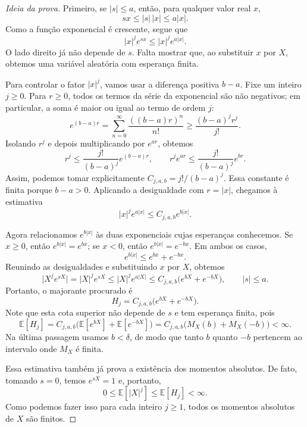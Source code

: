 \documentclass[12pt,portuguese]{article}
\theoremstyle{definition}
\theoremstyle{plainexercise}
\theoremstyle{starredexercise}
\theoremstyle{definition}
\begin{document}
\begin{proof}[Ideia da prova]
Primeiro, se $|s|\leqslant a$, então, para qualquer valor real $x$,
\[
sx\leqslant |s|\,|x|\leqslant a|x|.
\]
Como a função exponencial é crescente, segue que
\[
|x|^j e^{sx}\leqslant |x|^j e^{a|x|}.
\]
O lado direito já não depende de $s$. Falta mostrar que, ao substituir
$x$ por $X$, obtemos uma variável aleatória com esperança finita.

Para controlar o fator $|x|^j$, vamos usar a diferença positiva $b-a$.
Fixe um inteiro $j\geqslant0$. Para $r\geqslant0$, todos os termos da
série da exponencial são não negativos; em particular, a soma é maior
ou igual ao termo de ordem $j$:
\[
e^{(b-a)r}
=\sum_{n=0}^{\infty}\frac{((b-a)r)^n}{n!}
\geqslant\frac{(b-a)^j r^j}{j!}.
\]
Isolando $r^j$ e depois multiplicando por $e^{ar}$, obtemos
\[
r^j\leqslant\frac{j!}{(b-a)^j}e^{(b-a)r},
\qquad
r^j e^{ar}\leqslant\frac{j!}{(b-a)^j}e^{br}.
\]
Assim, podemos tomar explicitamente
$C_{j,a,b}=j!/(b-a)^j$. Essa constante é finita porque $b-a>0$.
Aplicando a desigualdade com $r=|x|$, chegamos à estimativa
\[
|x|^j e^{a|x|}\leqslant C_{j,a,b} e^{b|x|}.
\]

Agora relacionamos $e^{b|x|}$ às duas exponenciais cujas esperanças
conhecemos. Se $x\geqslant0$, então $e^{b|x|}=e^{bx}$; se $x<0$, então
$e^{b|x|}=e^{-bx}$. Em ambos os casos,
\[
e^{b|x|}\leqslant e^{bx}+e^{-bx}.
\]
Reunindo as desigualdades e substituindo $x$ por $X$, obtemos
\[
\bigl|X^j e^{sX}\bigr|
=|X|^j e^{sX}
\leqslant |X|^j e^{a|X|}
\leqslant C_{j,a,b}\bigl(e^{bX}+e^{-bX}\bigr),
\qquad |s|\leqslant a.
\]
Portanto, o majorante procurado é
\begin{equation}\label{eq:fgm-def-majorante}
H_j=C_{j,a,b}\bigl(e^{bX}+e^{-bX}\bigr).
\end{equation}
Note que esta cota superior não depende de $s$ e tem esperança finita, pois
\[
\mathbb{E}[H_j]
=C_{j,a,b}\bigl(\mathbb{E}[e^{bX}]+\mathbb{E}[e^{-bX}]\bigr)
=C_{j,a,b}\bigl(M_X(b)+M_X(-b)\bigr)<\infty.
\]
Na última passagem usamos $b<\delta$, de modo que tanto $b$ quanto $-b$
pertencem ao intervalo onde $M_X$ é finita.

Essa estimativa também já prova a existência dos momentos absolutos.
De fato, tomando $s=0$, temos $e^{sX}=1$ e, portanto,
\[
0\leqslant\mathbb{E}[|X|^j]
\leqslant\mathbb{E}[H_j]<\infty.
\]
Como podemos fazer isso para cada inteiro $j\geqslant1$, todos os
momentos absolutos de $X$ são finitos.


\end{proof}
\end{document}
